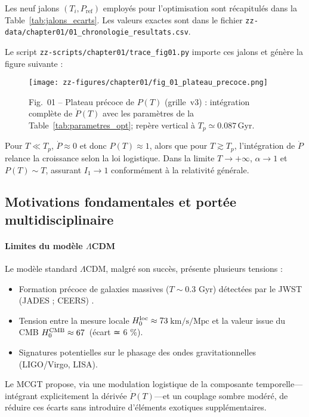 Les neuf jalons \((T_i,P_{\mathrm{ref}})\) employés pour l’optimisation sont récapitulés dans la Table~\ref{tab:jalons_ecarts}.
Les valeurs exactes sont dans le fichier
\texttt{zz-data/chapter01/01\_chronologie\_resultats.csv}.

Le script \texttt{zz-scripts/chapter01/trace\_fig01.py} importe ces jalons
et génère la figure suivante :

\begin{figure}[htbp]
  \centering
  \texttt{[image: zz-figures/chapter01/fig\_01\_plateau\_precoce.png]}
  \caption{Fig.~01 – Plateau précoce de \(P(T)\) (grille~v3) :
           intégration complète de \(\dot P(T)\) avec les paramètres de la Table~\ref{tab:parametres_opt};
           repère vertical à \(T_{p}\simeq0.087\,\mathrm{Gyr}\).}
  \label{fig:plateau_precoce}
\end{figure}

Pour \(T\ll T_{p}\), \(\dot P\approx0\) et donc \(P(T)\approx1\),
alors que pour \(T\gtrsim T_{p}\), l’intégration de \(\dot P\) relance la croissance selon la loi logistique.
Dans la limite \(T\to+\infty\), \(\alpha\to1\) et \(P(T)\sim T\), assurant \(I_{1}\to1\) conformément à la relativité générale.

\subsection{Motivations fondamentales et portée multidisciplinaire}

\paragraph{Limites du modèle \(\Lambda\)CDM}
Le modèle standard \(\Lambda\)CDM, malgré son succès, présente plusieurs tensions :
\begin{itemize}
  \item Formation précoce de galaxies massives (\(T\sim0.3\) Gyr) détectées par le JWST (JADES ; CEERS) \cite{JWST:JADES,JWST:CEERS}.
  \item Tension entre la mesure locale \(H_{0}^{\rm loc}\approx73\)\,\(\mathrm{km/s/Mpc}\) et la valeur issue du CMB \(H_{0}^{\rm CMB}\approx67\)\, (écart ≃ 6 \%).
  \item Signatures potentielles sur le phasage des ondes gravitationnelles (LIGO/Virgo, LISA).
\end{itemize}
Le MCGT propose, via une modulation logistique de la composante temporelle—intégrant explicitement la dérivée \(\dot P(T)\)—et un couplage sombre modéré, de réduire ces écarts sans introduire d’éléments exotiques supplémentaires.

